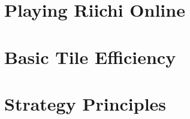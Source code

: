 \documentclass{book}
\begin{document}
\part{Playing Riichi Online} \label{part:online}





\part{Basic Tile Efficiency} \label{part:tile}






\part{Strategy Principles} \label{part:strat}








\begin{appendices}
\appendixpage \noappendicestocpagenum \addappheadtotoc




\end{appendices}

{\small \printindex}
\end{document}
